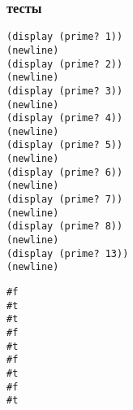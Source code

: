 \documentclass[11pt]{article}
\begin{document}
\subsubsection{тесты}
\label{sec:org2286e21}
\begin{verbatim}
(display (prime? 1))
(newline)
(display (prime? 2))
(newline)
(display (prime? 3))
(newline)
(display (prime? 4))
(newline)
(display (prime? 5))
(newline)
(display (prime? 6))
(newline)
(display (prime? 7))
(newline)
(display (prime? 8))
(newline)
(display (prime? 13))
(newline)
\end{verbatim}

\begin{verbatim}
#f
#t
#t
#f
#t
#f
#t
#f
#t
\end{verbatim}
\end{document}
